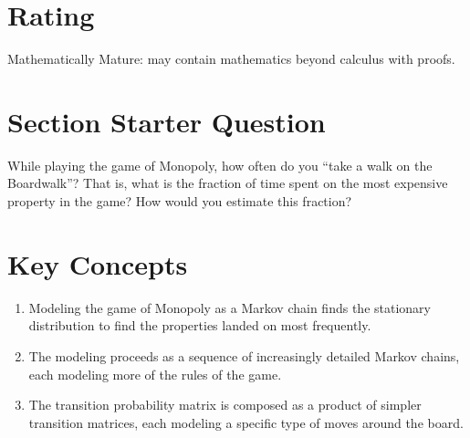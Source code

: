 \documentclass[12pt]{article}
\begin{document}
\myheader \mytitle

\hr


\hr

\usefirefox

\hr



\section*{Rating} %
Mathematically Mature:  may contain mathematics beyond calculus with
proofs.  %

\hr

\section*{Section Starter Question}

While playing the game of Monopoly, how often do you ``take a walk on
the Boardwalk''?  That is, what is the fraction of time spent on the
most expensive property in the game?  How would you estimate this
fraction?

\hr

\section*{Key Concepts}

\begin{enumerate}
    \item
        Modeling the game of Monopoly as a Markov chain finds the
        stationary distribution to find the properties landed on most
        frequently.
    \item
        The modeling proceeds as a sequence of increasingly detailed
        Markov chains, each modeling more of the rules of the game.
    \item
        The transition probability matrix is composed as a product of
        simpler transition matrices, each modeling a specific type of
        moves around the board.
\end{enumerate}
\end{document}
